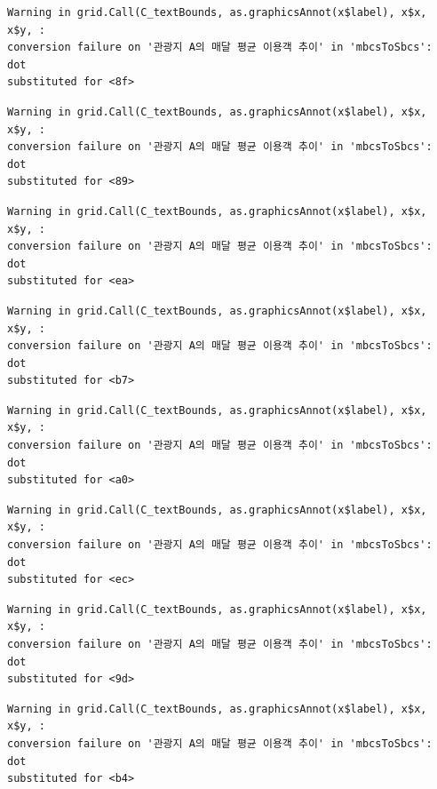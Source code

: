 \documentclass[
  letterpaper,
  DIV=11,
  numbers=noendperiod]{scrreprt}
\begin{document}
\begin{verbatim}
Warning in grid.Call(C_textBounds, as.graphicsAnnot(x$label), x$x, x$y, :
conversion failure on '관광지 A의 매달 평균 이용객 추이' in 'mbcsToSbcs': dot
substituted for <8f>
\end{verbatim}

\begin{verbatim}
Warning in grid.Call(C_textBounds, as.graphicsAnnot(x$label), x$x, x$y, :
conversion failure on '관광지 A의 매달 평균 이용객 추이' in 'mbcsToSbcs': dot
substituted for <89>
\end{verbatim}

\begin{verbatim}
Warning in grid.Call(C_textBounds, as.graphicsAnnot(x$label), x$x, x$y, :
conversion failure on '관광지 A의 매달 평균 이용객 추이' in 'mbcsToSbcs': dot
substituted for <ea>
\end{verbatim}

\begin{verbatim}
Warning in grid.Call(C_textBounds, as.graphicsAnnot(x$label), x$x, x$y, :
conversion failure on '관광지 A의 매달 평균 이용객 추이' in 'mbcsToSbcs': dot
substituted for <b7>
\end{verbatim}

\begin{verbatim}
Warning in grid.Call(C_textBounds, as.graphicsAnnot(x$label), x$x, x$y, :
conversion failure on '관광지 A의 매달 평균 이용객 추이' in 'mbcsToSbcs': dot
substituted for <a0>
\end{verbatim}

\begin{verbatim}
Warning in grid.Call(C_textBounds, as.graphicsAnnot(x$label), x$x, x$y, :
conversion failure on '관광지 A의 매달 평균 이용객 추이' in 'mbcsToSbcs': dot
substituted for <ec>
\end{verbatim}

\begin{verbatim}
Warning in grid.Call(C_textBounds, as.graphicsAnnot(x$label), x$x, x$y, :
conversion failure on '관광지 A의 매달 평균 이용객 추이' in 'mbcsToSbcs': dot
substituted for <9d>
\end{verbatim}

\begin{verbatim}
Warning in grid.Call(C_textBounds, as.graphicsAnnot(x$label), x$x, x$y, :
conversion failure on '관광지 A의 매달 평균 이용객 추이' in 'mbcsToSbcs': dot
substituted for <b4>
\end{verbatim}
\end{document}
